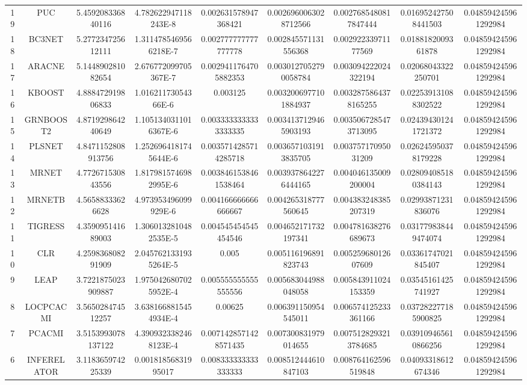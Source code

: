 \documentclass[a4paper,10pt]{article}
\begin{document}
\begin{landscape}
\begin{table}[!htp]
\begin{tabular}{ccccccccc}
19&PUC&5.459208336840116&4.782622947118243E-8&0.002631578947368421&0.0026960063028712566&0.0027685480817847444&0.016952427508441503&0.048594245961292984\\
18&BC3NET&5.277234725612111&1.3114785469566218E-7&0.002777777777777778&0.002845571131556368&0.00292233971177569&0.0188182009361878&0.048594245961292984\\
17&ARACNE&5.144890281082654&2.676772099705367E-7&0.0029411764705882353&0.0030127052790058784&0.003094222024322194&0.02068043322250701&0.048594245961292984\\
16&KBOOST&4.888472919806833&1.01621173054366E-6&0.003125&0.0032006977101884937&0.0032875864378165255&0.022539131088302522&0.048594245961292984\\
15&GRNBOOST2&4.871929864240649&1.1051340311016367E-6&0.0033333333333333335&0.0034137129465903193&0.0035067285473713095&0.024394301241721372&0.048594245961292984\\
14&PLSNET&4.8471152808913756&1.2526964181745644E-6&0.0035714285714285718&0.0036571031913835705&0.00375717095031209&0.026245950378179228&0.048594245961292984\\
13&MRNET&4.772671530843556&1.8179815746982995E-6&0.0038461538461538464&0.0039378642276444165&0.004046135009200004&0.028094085180384143&0.048594245961292984\\
12&MRNETB&4.56588333626628&4.973953496099929E-6&0.004166666666666667&0.004265318777560645&0.004383248385207319&0.02993871231836076&0.048594245961292984\\
11&TIGRESS&4.359095141689003&1.3060132810482535E-5&0.004545454545454546&0.004652171732197341&0.004781638276689673&0.031779838449474074&0.048594245961292984\\
10&CLR&4.259836808291909&2.0457621331935264E-5&0.005&0.005116196891823743&0.00525968012607609&0.03361747021845407&0.048594245961292984\\
9&LEAP&3.7221875023909887&1.9750426807025952E-4&0.005555555555555556&0.005683044988048058&0.005843911024153359&0.03545161425741927&0.048594245961292984\\
8&LOCPCACMI&3.565028474512257&3.6381668815454934E-4&0.00625&0.006391150954545011&0.006574125233361166&0.037282277185900825&0.048594245961292984\\
7&PCACMI&3.5153993078137122&4.3909323382468123E-4&0.0071428571428571435&0.007300831979014655&0.0075128293213784685&0.039109465610866256&0.048594245961292984\\
6&INFERELATOR&3.118365974225339&0.00181856831995017&0.008333333333333333&0.008512444610847103&0.008764162596519848&0.04093318612674346&0.048594245961292984\\

\end{tabular}
\end{table}
\end{landscape}
\end{document}
